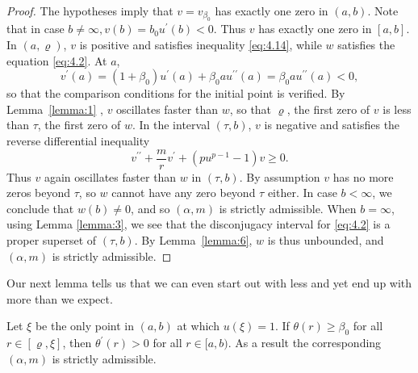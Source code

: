 \begin{proof}
  The hypotheses imply that $v=v_{\beta_0}$ has exactly one zero in $(a, b)$.
  Note that in case $b \neq \infty, v(b)=b_0 u^{\prime}(b)<0$.
  Thus $v$ has exactly one zero in $[a, b]$. In $(a, \varrho)$,
  $v$ is positive and satisfies inequality \eqref{eq:4.14},
  while $w$ satisfies the equation \eqref{eq:4.2}.
  At $a$,
  \[
    v^{\prime}(a) = \left(1+\beta_0\right) u^{\prime}(a)+\beta_0 a u^{\prime \prime}(a)
      = \beta_0 a u^{\prime \prime}(a) < 0,
  \]
  so that the comparison conditions for the initial point is verified.
  By Lemma~\ref{lemma:1} , $v$ oscillates faster than $w$, so that $\varrho$,
  the first zero of $v$ is less than $\tau$, the first zero of $w$.
  In the interval $(\tau, b)$, $v$ is negative and satisfies the reverse differential inequality
  \begin{equation}\label{eq:4.15}
    v^{\prime \prime}+\frac{m}{r} v^{\prime}+\left(p u^{p-1}-1\right) v \geq 0.
  \end{equation}
  Thus $v$ again oscillates faster than $w$ in $(\tau, b)$. By assumption $v$
  has no more zeros beyond $\tau$, so $w$ cannot have any zero beyond $\tau$ either.
  In case $b<\infty$, we conclude that $w(b) \neq 0$, and so $(\alpha, m)$
  is strictly admissible. When $b=\infty$, using Lemma \ref{lemma:3},
  we see that the disconjugacy interval for \eqref{eq:4.2} is a proper superset of $(\tau, b)$.
  By Lemma~\ref{lemma:6}, $w$ is thus unbounded, and $(\alpha, m)$ is strictly admissible.
\end{proof}

Our next lemma tells us that we can even start out with less and yet end up
with more than we expect.

\begin{lemma}\label{lemma:25}
  Let $\xi$ be the only point in $(a, b)$ at which $u(\xi)=1$. If $\theta(r) \geq \beta_0$
  for all $r \in[\varrho, \xi]$, then $\theta^{\prime}(r)>0$ for all $r \in[a, b)$.
  As a result the corresponding $(\alpha, m)$ is strictly admissible.
\end{lemma}

